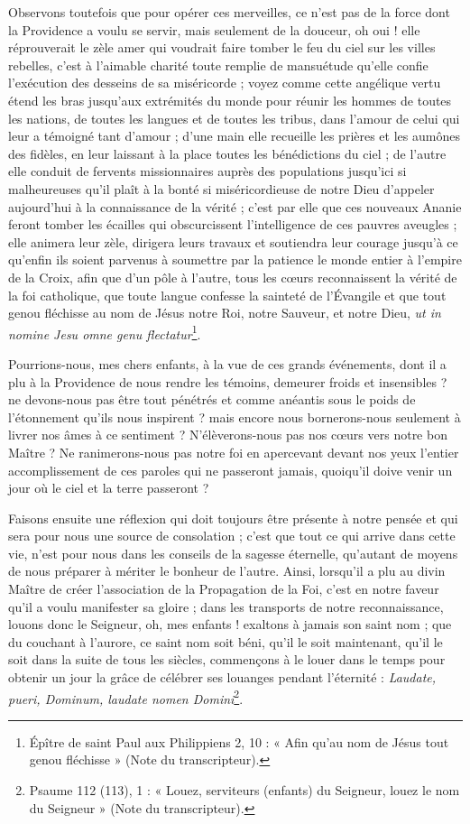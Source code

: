 \documentclass[11pt,a4paper]{report}
\begin{document}
Observons toutefois que pour opérer ces merveilles, ce n'est pas de la force dont la Providence a voulu se servir, mais seulement de la douceur, oh oui ! elle réprouverait le zèle amer qui voudrait faire tomber le feu du ciel sur les villes rebelles, c'est à l'aimable charité toute remplie de mansuétude qu'elle confie l'exécution des desseins de sa miséricorde ; voyez comme cette angélique vertu étend les bras jusqu'aux extrémités du monde pour réunir les hommes de toutes les nations, de toutes les langues et de toutes les tribus, dans l'amour de celui qui leur a témoigné tant d'amour ; d'une main elle recueille les prières et les aumônes des fidèles, en leur laissant à la place toutes les bénédictions du ciel ; de l'autre elle conduit de fervents missionnaires auprès des populations jusqu'ici si malheureuses qu'il plaît à la bonté si miséricordieuse de notre Dieu d'appeler aujourd'hui à la connaissance de la vérité ; c'est par elle que ces nouveaux Ananie feront tomber les écailles qui obscurcissent l'intelligence de ces pauvres aveugles ; elle animera leur zèle, dirigera leurs travaux et soutiendra leur courage jusqu'à ce qu'enfin ils soient parvenus à soumettre par la patience le monde entier à l'empire de la Croix, afin que d'un pôle à l'autre, tous les cœurs reconnaissent la vérité de la foi catholique, que toute langue confesse la sainteté de l'Évangile et que tout genou fléchisse au nom de Jésus notre Roi, notre Sauveur, et notre Dieu, \textit{ut in nomine Jesu omne genu flectatur}\footnote{Épître de saint Paul aux Philippiens 2, 10 : « Afin qu'au nom de Jésus tout genou fléchisse » (Note du transcripteur).}.

Pourrions-nous, mes chers enfants, à la vue de ces grands événements, dont il a plu à la Providence de nous rendre les témoins, demeurer froids et insensibles ? ne devons-nous pas être tout pénétrés et comme anéantis sous le poids de l'étonnement qu'ils nous inspirent ? mais encore nous bornerons-nous seulement à livrer nos âmes à ce sentiment ? N'élèverons-nous pas nos cœurs vers notre bon Maître ? Ne ranimerons-nous pas notre foi en apercevant devant nos yeux l'entier accomplissement de ces paroles qui ne passeront jamais, quoiqu'il doive venir un jour où le ciel et la terre passeront ?

Faisons ensuite une réflexion qui doit toujours être présente à notre pensée et qui sera pour nous une source de consolation ; c'est que tout ce qui arrive dans cette vie, n'est pour nous dans les conseils de la sagesse éternelle, qu'autant de moyens de nous préparer à mériter le bonheur de l'autre. Ainsi, lorsqu'il a plu au divin Maître de créer l'association de la Propagation de la Foi, c'est en notre faveur qu'il a voulu manifester sa gloire ; dans les transports de notre reconnaissance, louons donc le Seigneur, oh, mes enfants ! exaltons à jamais son saint nom ; que du couchant à l'aurore, ce saint nom soit béni, qu'il le soit maintenant, qu'il le soit dans la suite de tous les siècles, commençons à le louer dans le temps pour obtenir un jour la grâce de célébrer ses louanges pendant l'éternité : \textit{Laudate, pueri, Dominum, laudate nomen Domini}\footnote{Psaume 112 (113), 1 : « Louez, serviteurs (enfants) du Seigneur, louez le nom du Seigneur » (Note du transcripteur).}.
\end{document}
